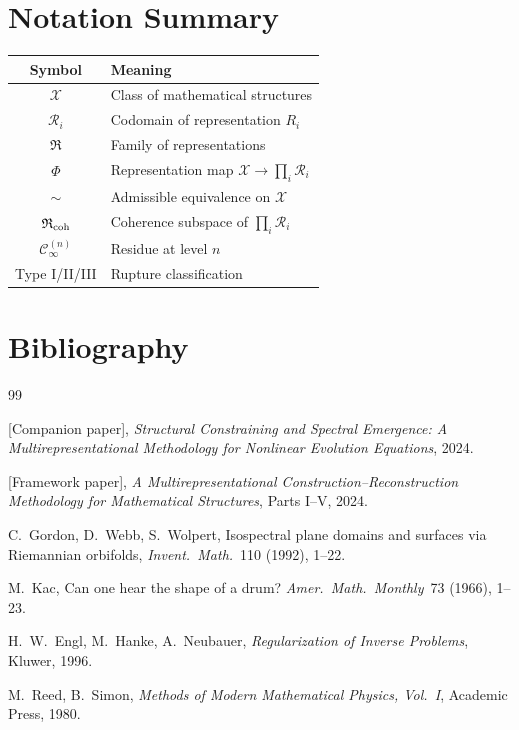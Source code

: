 \documentclass[11pt,a4paper]{article}
\theoremstyle{definition}
\theoremstyle{plain}
\newcommand{\Rcal}{\mathcal{R}}
\newcommand{\Ccal}{\mathcal{C}}
\newcommand{\Xcal}{\mathcal{X}}
\newcommand{\Rfrak}{\mathfrak{R}}
\newcommand{\Phimap}{\Phi}
\newcommand{\simadm}{\sim}
\begin{document}
\section{Notation Summary}
\label{app:notation}

\begin{center}
\begin{tabular}{c l}
  \toprule
  Symbol & Meaning \\
  \midrule
  $\Xcal$ & Class of mathematical structures \\
  $\Rcal_i$ & Codomain of representation $R_i$ \\
  $\Rfrak$ & Family of representations \\
  $\Phimap$ & Representation map $\Xcal \to \prod_i \Rcal_i$ \\
  $\simadm$ & Admissible equivalence on $\Xcal$ \\
  $\Rfrak_{\rm coh}$ & Coherence subspace of $\prod_i \Rcal_i$ \\
  $\Ccal_\infty^{(n)}$ & Residue at level $n$ \\
  Type I/II/III & Rupture classification \\
  \bottomrule
\end{tabular}
\end{center}

\section{Bibliography}
\label{app:biblio}

\begin{thebibliography}{99}

[Companion paper],
\emph{Structural Constraining and Spectral Emergence: A
Multirepresentational Methodology for Nonlinear Evolution
Equations}, 2024.

[Framework paper],
\emph{A Multirepresentational Construction--Reconstruction
Methodology for Mathematical Structures}, Parts I--V, 2024.

C.~Gordon, D.~Webb, S.~Wolpert,
Isospectral plane domains and surfaces via Riemannian orbifolds,
\emph{Invent.~Math.}~110 (1992), 1--22.

M.~Kac,
Can one hear the shape of a drum?
\emph{Amer.~Math.~Monthly}~73 (1966), 1--23.

H.~W.~Engl, M.~Hanke, A.~Neubauer,
\emph{Regularization of Inverse Problems}, Kluwer, 1996.

M.~Reed, B.~Simon,
\emph{Methods of Modern Mathematical Physics, Vol.~I},
Academic Press, 1980.

\end{thebibliography}
\end{document}
